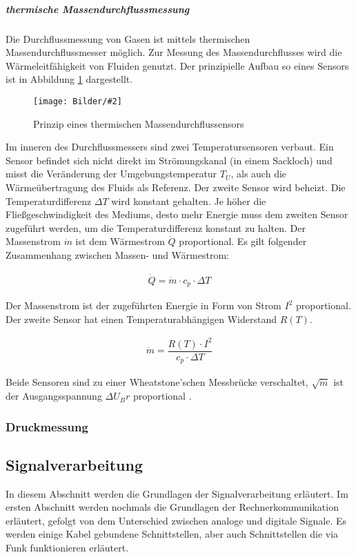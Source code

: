 \documentclass[
fontsize=12pt, 
paper=a4, 
BCOR=10mm, 
twoside=false,
 DIV=10, 
 headsepline, 
 footsepline
 ]{scrartcl}
\def\bild#1#2#3#4#5#6{%
\begin{figure}[h!] %
\centering
\texttt{[image: Bilder/\#2]}
\vspace{#3}
\caption[#4]{#5}\label{#6}
\end{figure}
}
\begin{document}
\subparagraph{thermische Massendurchflussmessung}

Die Durchflussmessung von Gasen ist mittels thermischen Massendurchflussmesser möglich. Zur Messung des Massendurchflusses wird die Wärmeleitfähigkeit von Fluiden genutzt. Der prinzipielle Aufbau so eines Sensors ist in Abbildung \ref{MFC} dargestellt.

\bild{0.5}
{MFC.png}
{0em}
{Prinzip eines thermischen Massendurchflussensors}
{Prinzip eines thermischen Massendurchflussensors}
{MFC}

 Im inneren des Durchflussmessers sind zwei Temperatursensoren verbaut. Ein Sensor befindet sich nicht direkt im Strömungskanal (in einem Sackloch) und misst die Veränderung der Umgebungstemperatur $T_U$, als auch die Wärmeübertragung des Fluids als Referenz. Der zweite Sensor wird beheizt. Die Temperaturdifferenz $\Delta T$ wird konstant gehalten. Je höher die Fließgeschwindigkeit des Mediums, desto mehr Energie muss dem zweiten Sensor zugeführt werden, um die Temperaturdifferenz konstant zu halten.  Der Massenstrom $\dot{m}$ ist dem Wärmestrom $\dot{Q}$ proportional. Es gilt folgender Zusammenhang zwischen Massen- und Wärmestrom:

\begin{align}
\dot{Q}=\dot{m} \cdot c_p \cdot  \Delta T
\end{align}

Der Massenstrom ist der zugeführten Energie in Form von Strom $I^2$ proportional. Der zweite Sensor hat einen Temperaturabhängigen Widerstand $R(T)$. 

\begin{align}
\dot{m}=\dfrac{R(T) \cdot I^2}{c_p \cdot \Delta T}
\end{align}

Beide Sensoren sind zu einer Wheatstone'schen Messbrücke verschaltet, $\sqrt{\dot{m}}$ ist der Ausgangsspannung $\Delta U_Br$ proportional .

\subsubsection{Druckmessung}



%
\subsection{Signalverarbeitung}



In diesem Abschnitt werden die Grundlagen der Signalverarbeitung erläutert. Im ersten Abschnitt werden nochmals die Grundlagen der Rechnerkommunikation erläutert, gefolgt von dem Unterschied zwischen analoge und digitale Signale. Es werden einige Kabel gebundene Schnittstellen, aber auch Schnittstellen die via Funk funktionieren erläutert.
\end{document}
